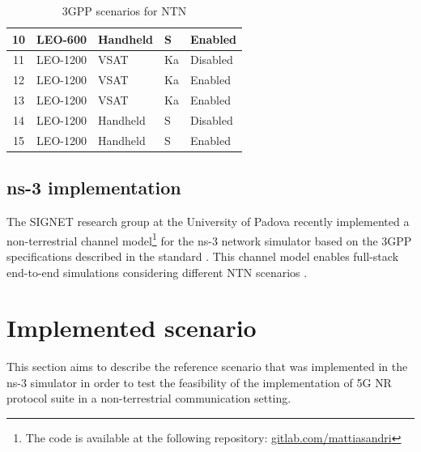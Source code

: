 \begin{table}[]
\begin{tabular}{cllll}
    10                  & LEO-600                                  & Handheld                                    & S                                       & Enabled                                               \\ \hline
    11                  & LEO-1200                                 & VSAT                                        & Ka                                      & Disabled                                              \\ \hline
    12                  & LEO-1200                                 & VSAT                                        & Ka                                      & Enabled                                               \\ \hline
    13                  & LEO-1200                                 & VSAT                                        & Ka                                      & Enabled                                               \\ \hline
    14                  & LEO-1200                                 & Handheld                                    & S                                       & Disabled                                              \\ \hline
    15                  & LEO-1200                                 & Handheld                                    & S                                       & Enabled                                               \\ \hline
    \end{tabular}
    \caption{3GPP scenarios for NTN \label{tab:scenarios}}
    \end{table}

\subsection{ns-3 implementation}
The SIGNET research group at the University of Padova recently implemented a non-terrestrial channel model\footnote{The code is available at the following repository: \href{https://gitlab.com/mattiasandri/ns-3-ntn/-/tree/ntn-dev?ref_type=heads}{gitlab.com/mattiasandri}} for the ns-3 network simulator based on the \ac{3GPP} specifications described in the standard \cite{3gpp-tr-38.811}.
This channel model enables full-stack end-to-end simulations considering different \ac{NTN} scenarios \cite{Sandri_2023}.

\section{Implemented scenario}

This section aims to describe the reference scenario that was implemented in the ns-3 simulator in order to test the feasibility of the implementation of 5G \ac{NR} protocol suite in a non-terrestrial communication setting. 
